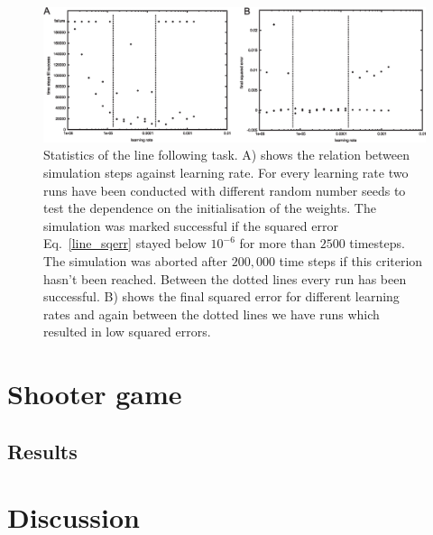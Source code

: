 \documentclass{llncs}
\begin{document}
\begin{figure}[h!]
  \centering
  \includegraphics[width=\columnwidth]{line_stats}
  \caption{Statistics of the line following task. A) shows the relation between
    simulation steps against learning rate. For every learning rate two runs have
    been conducted with different random number seeds to test the dependence on the
    initialisation of the weights. The simulation was marked successful if the
    squared error Eq.~\ref{line_sqerr} stayed below $10^{-6}$ for more than $2500$
    timesteps. The simulation was aborted after $200,000$ time steps if this criterion
    hasn't been reached. Between the dotted lines every run has been successful.
    B) shows the final squared error for different learning rates and again between
    the dotted lines we have runs which resulted in low squared errors.
    \label{line_stats}}
\end{figure}





\section{Shooter game}


\subsection{Results}


\section{Discussion}




\end{document}
